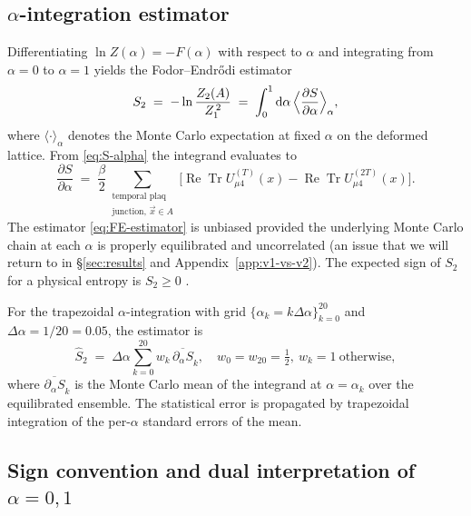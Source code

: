 \documentclass[11pt,a4paper]{article}
\theoremstyle{definition}
\newcommand{\Tr}{\operatorname{Tr}}
\renewcommand{\Re}{\operatorname{Re}}
\newcommand{\half}{\tfrac{1}{2}}
\newcommand{\dee}{\mathrm{d}}
\begin{document}
\subsection{$\alpha$-integration estimator}
\label{sec:alpha-int}

Differentiating $\ln Z(\alpha) = -F(\alpha)$ with respect to $\alpha$
and integrating from $\alpha = 0$ to $\alpha = 1$ yields the
Fodor--Endr\H{o}di estimator
\begin{equation}
   S_2 \;=\; -\ln\frac{Z_2(A)}{Z_1^{\,2}}
        \;=\; \int_0^1 \dee\alpha\,\Bigl\langle \frac{\partial S}{\partial \alpha}
              \Bigr\rangle_{\alpha},
   \label{eq:FE-estimator}
\end{equation}
where $\langle \cdot \rangle_\alpha$ denotes the Monte Carlo
expectation at fixed $\alpha$ on the deformed lattice. From
\eqref{eq:S-alpha} the integrand evaluates to
\begin{equation}
   \frac{\partial S}{\partial \alpha} \;=\;
   \frac{\beta}{2}\sum_{\substack{\text{temporal plaq}\\\text{junction, } \vec x \in A}}
        \bigl[\Re\Tr U^{(T)}_{\mu 4}(x) - \Re\Tr U^{(2T)}_{\mu 4}(x)\bigr].
   \label{eq:dS-dalpha}
\end{equation}
The estimator \eqref{eq:FE-estimator} is unbiased provided the
underlying Monte Carlo chain at each $\alpha$ is properly equilibrated
and uncorrelated (an issue that we will return to in
\S\ref{sec:results} and Appendix~\ref{app:v1-vs-v2}). The expected
sign of $S_2$ for a physical entropy is $S_2 \ge 0$
\cite{Rabenstein2019}.

\medskip

For the trapezoidal $\alpha$-integration with grid
$\{\alpha_k = k \Delta\alpha\}_{k=0}^{20}$ and
$\Delta\alpha = 1/20 = 0.05$, the estimator is
\begin{equation}
   \widehat S_2 \;=\; \Delta\alpha \sum_{k=0}^{20} w_k\,
                       \overline{\partial_\alpha S}_k,
   \quad w_0 = w_{20} = \half,\ w_k = 1\ \text{otherwise},
   \label{eq:trap-estimator}
\end{equation}
where $\overline{\partial_\alpha S}_k$ is the Monte Carlo mean of the
integrand at $\alpha = \alpha_k$ over the equilibrated ensemble. The
statistical error is propagated by trapezoidal integration of the
per-$\alpha$ standard errors of the mean.

\subsection{Sign convention and dual interpretation of $\alpha = 0,1$}
\label{sec:sign}
\end{document}
